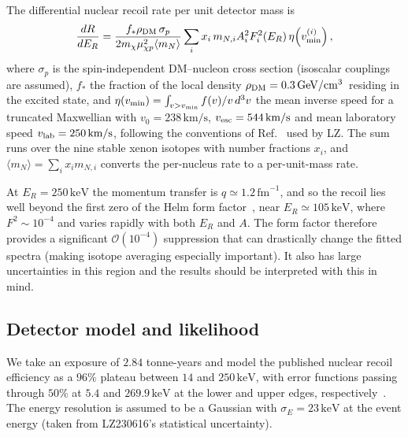 \documentclass[aps,prl,twocolumn,superscriptaddress,nofootinbib,floatfix,longbibliography]{revtex4-2}
\newcommand{\keV}{\ensuremath{\,\mathrm{keV}}}
\newcommand{\GeV}{\ensuremath{\,\mathrm{GeV}}}
\newcommand{\ER}{\ensuremath{E_R}}
\newcommand{\mchi}{\ensuremath{m_\chi}}
\newcommand{\vmin}{\ensuremath{v_{\rm min}}}
\begin{document}
The differential nuclear recoil rate per unit detector mass is
%
\begin{equation}
  \frac{dR}{d\ER} =
  \frac{f_*\rho_{\rm DM}\, \sigma_p}{2 \mchi \mu_{\chi p}^2 \langle m_N\rangle}
  \sum_i x_i\, m_{N,i} A_i^2 F_i^2(\ER)\, \eta\!\left(\vmin^{(i)}\right),
  \label{eq:rate}
\end{equation}
%
where $\sigma_p$ is the spin-independent DM--nucleon cross section (isoscalar couplings are assumed), $f_*$ the fraction of the local density $\rho_{\rm DM} = 0.3\GeV/\mathrm{cm}^3$~residing in the excited state, and $\eta(\vmin) = \int_{v>\vmin} f(v)/v\, d^3v$ the mean inverse speed for a truncated Maxwellian with $v_0 = 238\,\mathrm{km/s}$, $v_{\rm esc} = 544\,\mathrm{km/s}$ and mean laboratory speed $v_{\rm lab} = 250\,\mathrm{km/s}$, following the conventions of Ref.~\cite{Baxter:2021pqo} used by LZ. The sum runs over the nine stable xenon isotopes with number fractions $x_i$, and $\langle m_N \rangle = \sum_i x_i m_{N,i}$ converts the per-nucleus rate to a per-unit-mass rate.

At $\ER = 250\keV$ the momentum transfer is $q \simeq 1.2\,\mathrm{fm}^{-1}$, and so the recoil lies well beyond the first zero of the Helm form factor~\cite{Helm:1956zz}, near $\ER \simeq 105\keV$, where $F^2 \sim 10^{-4}$ and varies rapidly with both $\ER$ and $A$. The form factor therefore provides a significant $\mathcal{O}(10^{-4})$ suppression that can drastically change the fitted spectra (making isotope averaging especially important). It also has large uncertainties in this region and the results should be interpreted with this in mind.

\subsection{Detector model and likelihood}

We take an exposure of $2.84$ tonne-years and model the published nuclear recoil efficiency as a $96\%$ plateau between $14$ and $250\keV$, with error functions passing through $50\%$ at $5.4$ and $269.9\keV$ at the lower and upper edges, respectively~\cite{LZ:2026axp}. The energy resolution is assumed to be a Gaussian with $\sigma_E = 23\keV$ at the event energy (taken from LZ230616's statistical uncertainty). 
\end{document}
